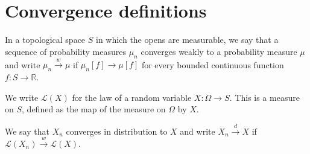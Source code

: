 \chapter{Convergence definitions}


\begin{definition}\label{def:weak_cvg_measure}
\mathlibok
{}
In a topological space $S$ in which the opens are measurable, we say that a sequence of probability measures $\mu_n$ converges weakly to a probability measure $\mu$ and write $\mu_n \xrightarrow{w} \mu$ if $\mu_n[f] \to \mu[f]$ for every bounded continuous function $f : S \to \mathbb{R}$.
\end{definition}

We write $\mathcal L(X)$ for the law of a random variable $X : \Omega \to S$. This is a measure on $S$, defined as the map of the measure on $\Omega$ by $X$.

\begin{definition}\label{def:cvg_distribution}
\mathlibok
{}
We say that $X_n$ converges in distribution to $X$ and write $X_n \xrightarrow{d} X$ if $\mathcal L(X_n) \xrightarrow{w} \mathcal L(X)$.
\end{definition}